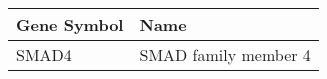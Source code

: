 \begin{tabular}{ll}
\toprule
Gene Symbol &                 Name \\
\midrule
      SMAD4 & SMAD family member 4 \\
\bottomrule
\end{tabular}

